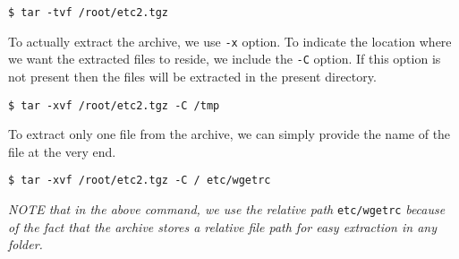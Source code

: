 \begin{verbatim}
$ tar -tvf /root/etc2.tgz
\end{verbatim}

\noindent
To actually extract the archive, we use \verb|-x| option. To indicate the location where we want the extracted files to reside, we include the \verb|-C| option. If this option is not present then the files will be extracted in the present directory. 

\begin{verbatim}
$ tar -xvf /root/etc2.tgz -C /tmp
\end{verbatim}

\noindent
To extract only one file from the archive, we can simply provide the name of the file at the very end. 

\begin{verbatim}
$ tar -xvf /root/etc2.tgz -C / etc/wgetrc
\end{verbatim}

\noindent
\textit{NOTE that in the above command, we use the relative path} \verb|etc/wgetrc| \textit{because of the fact that the archive stores a relative file path for easy extraction in any folder.}